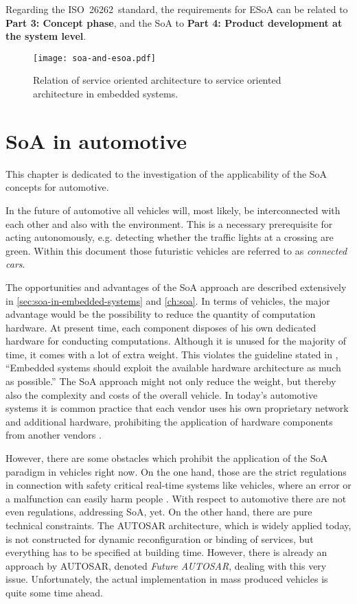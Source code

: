 Regarding the \mbox{ISO 26262 standard}, the requirements for ESoA can be related to \textbf{Part 3: Concept phase}, and the SoA to \textbf{Part 4: Product development at the system level}.


\begin{figure}[!htbp]
\centering
\texttt{[image: soa-and-esoa.pdf]}
\caption{Relation of service oriented architecture to service oriented architecture in embedded systems.}
\label{fig:soa-and-esoa}
\end{figure}







\section{SoA in automotive}
\label{sec:soa-in-automotive}

This chapter is dedicated to the investigation of the applicability of the SoA concepts for automotive.

In the future of automotive all vehicles will, most likely, be interconnected with each other and also with the environment. This is a necessary prerequisite for acting autonomously, e.g. detecting whether the traffic lights at a crossing are green. Within this document those futuristic vehicles are referred to as \emph{connected cars}.

The opportunities and advantages of the SoA approach are described extensively in \ref{sec:soa-in-embedded-systems} and \ref{ch:soa}. In terms of vehicles, the major advantage would be the possibility to reduce the quantity of computation hardware. At present time, each component disposes of his own dedicated hardware for conducting computations. Although it is unused for the majority of time, it comes with a lot of extra weight. This violates the guideline stated in \cite[p.7]{marwedel}, ``Embedded systems should exploit the available hardware architecture as much as possible.'' The SoA approach might not only reduce the weight, but thereby also the complexity and costs of the overall vehicle. In today's automotive systems it is common practice that each vendor uses his own proprietary network and additional hardware, prohibiting the application of hardware components from another vendors \cite{sommer}.

However, there are some obstacles which prohibit the application of the SoA paradigm in vehicles right now. On the one hand, those are the strict regulations in connection with safety critical real-time systems like vehicles, where an error or a malfunction can easily harm people \cite{kum}. With respect to automotive there are not even regulations, addressing SoA, yet. On the other hand, there are pure technical constraints. The AUTOSAR architecture, which is widely applied today, is not constructed for dynamic reconfiguration or binding of services, but everything has to be specified at building time. However, there is already an approach by AUTOSAR, denoted \emph{Future AUTOSAR}, dealing with this very issue. Unfortunately, the actual implementation in mass produced vehicles is quite some time ahead.

